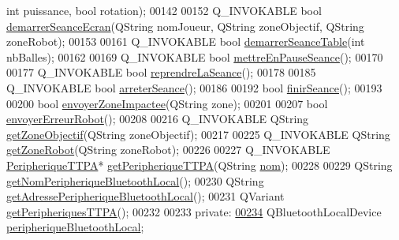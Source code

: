\begin{DoxyCode}
{      int} puissance, \textcolor{keywordtype}{bool} rotation);
00142 
00152     Q\_INVOKABLE \textcolor{keywordtype}{bool} \hyperlink{class_communication_bluetooth_a024493f537e8501a813e1555716cf7ad}{demarrerSeanceEcran}(QString nomJoueur, QString zoneObjectif, 
      QString zoneRobot);
00153 
00161     Q\_INVOKABLE \textcolor{keywordtype}{bool} \hyperlink{class_communication_bluetooth_abb71c8f555c64d1791d330955ace417c}{demarrerSeanceTable}(\textcolor{keywordtype}{int} nbBalles);
00162 
00169     Q\_INVOKABLE \textcolor{keywordtype}{bool} \hyperlink{class_communication_bluetooth_a8572b6316814e3d226ce7acc754f0c4d}{mettreEnPauseSeance}();
00170 
00177     Q\_INVOKABLE \textcolor{keywordtype}{bool} \hyperlink{class_communication_bluetooth_a1bcf85f34d2902ba6fe3b6929b409272}{reprendreLaSeance}();
00178 
00185     Q\_INVOKABLE \textcolor{keywordtype}{bool} \hyperlink{class_communication_bluetooth_a4b0e71c1f161c14278f3ab55b1910c64}{arreterSeance}();
00186 
00192     \textcolor{keywordtype}{bool} \hyperlink{class_communication_bluetooth_ab2170ef9c868ac2a26b76675c71f770e}{finirSeance}();
00193 
00200     \textcolor{keywordtype}{bool} \hyperlink{class_communication_bluetooth_a5906cd18db7ce9467452acf0ed845f23}{envoyerZoneImpactee}(QString zone);
00201 
00207     \textcolor{keywordtype}{bool} \hyperlink{class_communication_bluetooth_a891295407273a810ef9300e743bc34f9}{envoyerErreurRobot}();
00208 
00216     Q\_INVOKABLE QString \hyperlink{class_communication_bluetooth_a6fcee1677888958590d5f80a5149aabf}{getZoneObjectif}(QString zoneObjectif);
00217 
00225     Q\_INVOKABLE QString \hyperlink{class_communication_bluetooth_a1660fbcba9b118755a57e46543868f80}{getZoneRobot}(QString zoneRobot);
00226 
00227     Q\_INVOKABLE \hyperlink{class_peripherique_t_t_p_a}{PeripheriqueTTPA}* \hyperlink{class_communication_bluetooth_a1baec10cc16afe1a87cbad635a82c323}{getPeripheriqueTTPA}(QString 
      \hyperlink{class_communication_bluetooth_a320cc60a0cb6b4ea9e009fef2853f1d2}{nom});
00228 
00229     QString \hyperlink{class_communication_bluetooth_a20694d5121f78fe4b83b1ef93a2dd5d1}{getNomPeripheriqueBluetoothLocal}();
00230     QString \hyperlink{class_communication_bluetooth_affe39c52a35aec101c04d333b6249162}{getAdressePeripheriqueBluetoothLocal}();
00231     QVariant \hyperlink{class_communication_bluetooth_a08f0efb9f8a5a9f0660aad870032b9d3}{getPeripheriquesTTPA}();
00232 
00233 \textcolor{keyword}{private}:
\hyperlink{class_communication_bluetooth_a03c857db65a9ea5a0b944844f675e6fa}{00234}     QBluetoothLocalDevice \hyperlink{class_communication_bluetooth_a03c857db65a9ea5a0b944844f675e6fa}{peripheriqueBluetoothLocal}; 

\end{DoxyCode}
